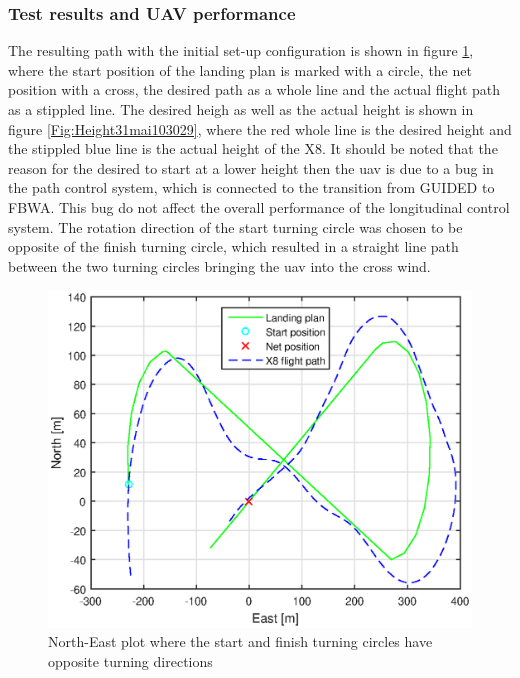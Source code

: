 \subsubsection{Test results and UAV performance}
The resulting path with the initial set-up configuration is shown in figure \ref{Fig:NorthEast31mai103029}, where the start position of the landing plan is marked with a circle, the net position with a cross, the desired path as a whole line and the actual flight path as a stippled line. The desired heigh as well as the actual height is shown in figure \ref{Fig:Height31mai103029}, where the red whole line is the desired height and the stippled blue line is the actual height of the X8. It should be noted that the reason for the desired to start at a lower height then the \gls{uav} is due to a bug in the path control system, which is connected to the transition from GUIDED to FBWA. This bug do not affect the overall performance of the longitudinal control system. The rotation direction of the start turning circle was chosen to be opposite of the finish turning circle, which resulted in a straight line path between the two turning circles bringing the \gls{uav} into the cross wind.
\begin{figure}[H]
	\centering
		\includegraphics[scale=0.7]{figs/Experiment/NorthEast31mai103029.eps}
		\caption{North-East plot where the start and finish turning circles have opposite turning directions}
		\label{Fig:NorthEast31mai103029}
\end{figure}
